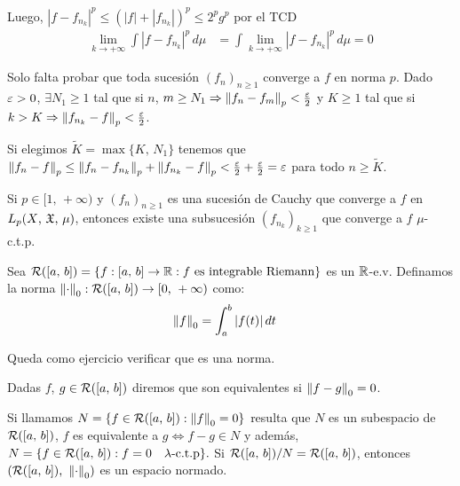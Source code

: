 Luego, \(|f - f_{n_k}|^p \leq \left( |f| + |f_{n_k}|\right)^p \leq 2^p g^p \) por el TCD \begin{align*}
    \lim_{k \to +\infty} \int |f - f_{n_k}|^p \, d\mu & = \int \lim_{k \to +\infty} |f - f_{n_k}|^p \, d\mu = 0
\end{align*}

Solo falta probar que toda sucesión \((f_n)_{n \geq 1}\) converge a \(f\) en norma \(p\). Dado \(\varepsilon > 0\), \(\exists N_1 \geq 1\) tal que si \(n\), \(m \geq N_1 \Rightarrow \left\lVert f_n - f_m\right\rVert_p < \frac{\varepsilon}{2}\) y \(K \geq 1\) tal que si \(k > K \Rightarrow \left\lVert f_{n_k} - f\right\rVert_p < \frac{\varepsilon}{2}\).

Si elegimos \(\tilde{K} = \max\{ K \text{, } N_1 \}\) tenemos que \(\left\lVert f_n - f\right\rVert_p \leq \left\lVert f_n - f_{n_k}\right\rVert_p + \left\lVert f_{n_k} - f\right\rVert_p < \frac{\varepsilon}{2} + \frac{\varepsilon}{2} = \varepsilon\) para todo \(n \geq \tilde{K}\).

\begin{corollary}
    Si \(p \in [1 \text{, } +\infty)\) y \((f_n)_{n \geq 1}\) es una sucesión de Cauchy que converge a \(f\) en \(L_p(X \text{, } \mathfrak{X} \text{, } \mu)\), entonces
    existe una subsucesión \((f_{n_k})_{k \geq 1}\) que converge a \(f\) \(\mu\)-c.t.p.
\end{corollary}


\begin{definition}
    Sea \(\mathcal{R}([a \text{, } b]) = \{ f : [a \text{, } b] \to \mathbb{R} : f \text{ es integrable Riemann} \}\) es un \(\mathbb{R}\)-e.v. Definamos la norma \(\left\lVert\cdot\right\rVert_0 : \mathcal{R}([a \text{, } b]) \to [0 \text{, } +\infty )\) como: \begin{align*}
        \left\lVert f\right\rVert_0 & = \int_a^b |f(t)| \, dt
    \end{align*}

    Queda como ejercicio verificar que es una norma.
\end{definition}


\begin{definition}
    Dadas \(f\), \(g \in \mathcal{R}([a \text{, } b])\) diremos que son equivalentes si \(\left\lVert f - g\right\rVert_0 = 0\).
\end{definition}

Si llamamos \(N = \{ f \in \mathcal{R}([a \text{, } b]) : \left\lVert f\right\rVert_0 = 0 \}\) resulta que \(N\) es un subespacio de \(\mathcal{R}([a \text{, }b])\), \(f\) es equivalente a \(g \iff f-g \in N\) y además,
\(N = \{ f \in \mathcal{R}([a \text{, }b]) : f = 0 \quad \lambda \text{-c.t.p} \}.\) Si \(\mathcal{R}([a \text{, } b]) / N = \mathcal{R}([a \text{, } b])\), entonces \((\mathcal{R}([a \text{, } b])\text{, } \left\lVert\cdot\right\rVert_0)\) es un espacio normado.

